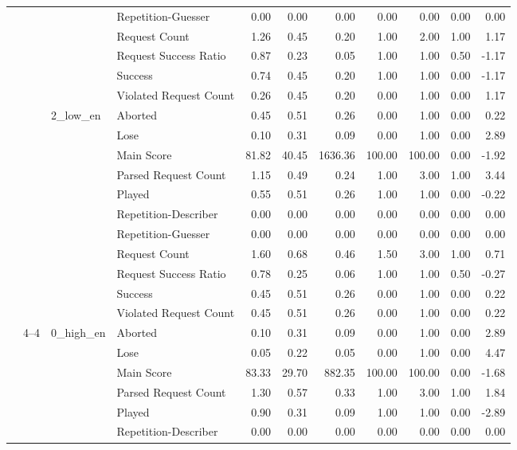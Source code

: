 \begin{tabular}{llllrrrrrrr}
 &  &  & Repetition-Guesser & 0.00 & 0.00 & 0.00 & 0.00 & 0.00 & 0.00 & 0.00 \\
 &  &  & Request Count & 1.26 & 0.45 & 0.20 & 1.00 & 2.00 & 1.00 & 1.17 \\
 &  &  & Request Success Ratio & 0.87 & 0.23 & 0.05 & 1.00 & 1.00 & 0.50 & -1.17 \\
 &  &  & Success & 0.74 & 0.45 & 0.20 & 1.00 & 1.00 & 0.00 & -1.17 \\
 &  &  & Violated Request Count & 0.26 & 0.45 & 0.20 & 0.00 & 1.00 & 0.00 & 1.17 \\
\cline{3-11}
 &  & \multirow[t]{11}{*}{2_low_en} & Aborted & 0.45 & 0.51 & 0.26 & 0.00 & 1.00 & 0.00 & 0.22 \\
 &  &  & Lose & 0.10 & 0.31 & 0.09 & 0.00 & 1.00 & 0.00 & 2.89 \\
 &  &  & Main Score & 81.82 & 40.45 & 1636.36 & 100.00 & 100.00 & 0.00 & -1.92 \\
 &  &  & Parsed Request Count & 1.15 & 0.49 & 0.24 & 1.00 & 3.00 & 1.00 & 3.44 \\
 &  &  & Played & 0.55 & 0.51 & 0.26 & 1.00 & 1.00 & 0.00 & -0.22 \\
 &  &  & Repetition-Describer & 0.00 & 0.00 & 0.00 & 0.00 & 0.00 & 0.00 & 0.00 \\
 &  &  & Repetition-Guesser & 0.00 & 0.00 & 0.00 & 0.00 & 0.00 & 0.00 & 0.00 \\
 &  &  & Request Count & 1.60 & 0.68 & 0.46 & 1.50 & 3.00 & 1.00 & 0.71 \\
 &  &  & Request Success Ratio & 0.78 & 0.25 & 0.06 & 1.00 & 1.00 & 0.50 & -0.27 \\
 &  &  & Success & 0.45 & 0.51 & 0.26 & 0.00 & 1.00 & 0.00 & 0.22 \\
 &  &  & Violated Request Count & 0.45 & 0.51 & 0.26 & 0.00 & 1.00 & 0.00 & 0.22 \\
\cline{2-11} \cline{3-11}
 & \multirow[t]{33}{*}{4--4} & \multirow[t]{11}{*}{0_high_en} & Aborted & 0.10 & 0.31 & 0.09 & 0.00 & 1.00 & 0.00 & 2.89 \\
 &  &  & Lose & 0.05 & 0.22 & 0.05 & 0.00 & 1.00 & 0.00 & 4.47 \\
 &  &  & Main Score & 83.33 & 29.70 & 882.35 & 100.00 & 100.00 & 0.00 & -1.68 \\
 &  &  & Parsed Request Count & 1.30 & 0.57 & 0.33 & 1.00 & 3.00 & 1.00 & 1.84 \\
 &  &  & Played & 0.90 & 0.31 & 0.09 & 1.00 & 1.00 & 0.00 & -2.89 \\
 &  &  & Repetition-Describer & 0.00 & 0.00 & 0.00 & 0.00 & 0.00 & 0.00 & 0.00 \\

\end{tabular}
